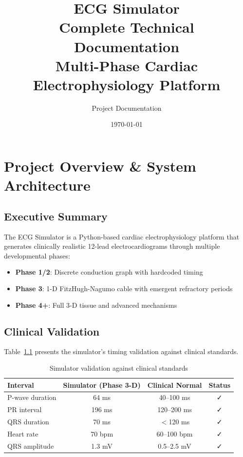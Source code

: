 \documentclass[12pt,oneside,a4paper]{book}
\title{%
  \Huge\textbf{ECG Simulator}\\
  \Large Complete Technical Documentation\\
  \normalsize Multi-Phase Cardiac Electrophysiology Platform
}
\author{Project Documentation}
\date{\today}
\begin{document}
\maketitle
\tableofcontents
\newpage


\chapter{Project Overview \& System Architecture}

\section{Executive Summary}

The ECG Simulator is a Python-based cardiac electrophysiology platform that generates clinically realistic 12-lead electrocardiograms through multiple developmental phases:

\begin{itemize}
  \item \textbf{Phase 1/2}: Discrete conduction graph with hardcoded timing
  \item \textbf{Phase 3}: 1-D FitzHugh-Nagumo cable with emergent refractory periods
  \item \textbf{Phase 4+}: Full 3-D tissue and advanced mechanisms
\end{itemize}

\section{Clinical Validation}

Table~\ref{tab:validation} presents the simulator's timing validation against clinical standards.

\begin{table}[htb]
\centering
\begin{tabularx}{\textwidth}{|l|c|c|c|}
\hline
\textbf{Interval} & \textbf{Simulator (Phase 3-D)} & \textbf{Clinical Normal} & \textbf{Status} \\
\hline
P-wave duration & 64 ms & 40--100 ms & ✓ \\
PR interval & 196 ms & 120--200 ms & ✓ \\
QRS duration & 70 ms & $<$120 ms & ✓ \\
Heart rate & 70 bpm & 60--100 bpm & ✓ \\
QRS amplitude & 1.3 mV & 0.5--2.5 mV & ✓ \\
\hline
\end{tabularx}
\caption{Simulator validation against clinical standards}
\label{tab:validation}
\end{table}
\end{document}
